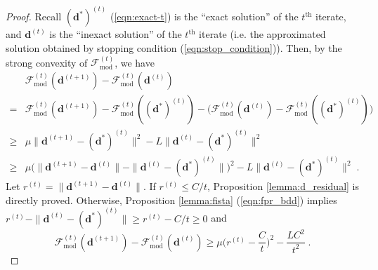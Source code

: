 \documentclass[final]{siamart1116}
\newcommand{\mb}[1]{\mathbf{#1}}
\def \F  {\mathcal{F}}
\begin{document}
\begin{proof} Recall $(\mb{d}^*)^{(t)}$ (\ref{eqn:exact-t}) is the ``exact solution'' of the $t^{\text{th}}$ iterate, and $\mb{d}^{(t)}$ is the ``inexact solution'' of the $t^{\text{th}}$ iterate (i.e. the approximated solution obtained by stopping condition (\ref{eqn:stop_condition})). Then, by the strong convexity of $\F^{(t)}_{\mathrm{mod}}$, we have
\[
\begin{aligned}
&\F^{(t)}_{\mathrm{mod}}(\mb{d}^{(t+1)}) - \F^{(t)}_{\mathrm{mod}}(\mb{d}^{(t)})\\
=& \F^{(t)}_{\mathrm{mod}}(\mb{d}^{(t+1)}) - \F^{(t)}_{\mathrm{mod}}((\mb{d}^*)^{(t)}) - \Big(\F^{(t)}_{\mathrm{mod}}(\mb{d}^{(t)}) - \F^{(t)}_{\mathrm{mod}}((\mb{d}^*)^{(t)})\Big)\\
\geq & \mu \|\mb{d}^{(t+1)} - (\mb{d}^*)^{(t)}\|^2 - L \| \mb{d}^{(t)} - (\mb{d}^*)^{(t)} \|^2\\
\geq & \mu \Big(\|\mb{d}^{(t+1)} - \mb{d}^{(t)}\| - \|\mb{d}^{(t)} - (\mb{d}^*)^{(t)}\|\Big)^2- L \| \mb{d}^{(t)} - (\mb{d}^*)^{(t)} \|^2 \;.
\end{aligned}
\]
Let $r^{(t)} = \|\mb{d}^{(t+1)} - \mb{d}^{(t)}\|$. If $r^{(t)}\leq C/t$, Proposition \ref{lemma:d_residual} is directly proved. Otherwise,  Proposition \ref{lemma:fista} (\ref{eqn:fpr_bdd}) implies $r^{(t)} - \|\mb{d}^{(t)} - (\mb{d}^*)^{(t)}\| \geq r^{(t)} - C/t \geq 0$ and
\begin{equation}
\label{eq:first_bd}
\F^{(t)}_{\mathrm{mod}}(\mb{d}^{(t+1)}) - \F^{(t)}_{\mathrm{mod}}(\mb{d}^{(t)}) \geq \mu\Big(r^{(t)} - \frac{C }{t}\Big)^2 - \frac{LC^2}{t^2} \;.
\end{equation}


\end{proof}
\end{document}
